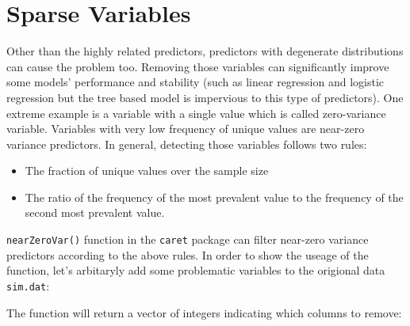\documentclass[12pt,]{krantz}
\makeatletter
\newenvironment{Shaded}{\begin{snugshade}}{\end{snugshade}}
\newcommand{\CommentTok}[1]{\textcolor[rgb]{0.37,0.37,0.37}{\textit{#1}}}
\newcommand{\DecValTok}[1]{\textcolor[rgb]{0.06,0.06,0.06}{#1}}
\newcommand{\KeywordTok}[1]{\textcolor[rgb]{0.27,0.27,0.27}{\textbf{#1}}}
\newcommand{\NormalTok}[1]{#1}
\newcommand{\OperatorTok}[1]{\textcolor[rgb]{0.43,0.43,0.43}{\textbf{#1}}}
\newcommand{\StringTok}[1]{\textcolor[rgb]{0.5,0.5,0.5}{#1}}
\providecommand{\tightlist}{%
  \setlength{\itemsep}{0pt}\setlength{\parskip}{0pt}}
\newenvironment{kframe}{%
\medskip{}
\setlength{\fboxsep}{.8em}
 \def\at@end@of@kframe{}%
 \ifinner\ifhmode%
  \def\at@end@of@kframe{\end{minipage}}%
  \begin{minipage}{\columnwidth}%
 \fi\fi%
 \def\FrameCommand##1{\hskip\@totalleftmargin \hskip-\fboxsep
 \colorbox{shadecolor}{##1}\hskip-\fboxsep
     \hskip-\linewidth \hskip-\@totalleftmargin \hskip\columnwidth}%
 \MakeFramed {\advance\hsize-\width
   \@totalleftmargin\z@ \linewidth\hsize
   \@setminipage}}%
 {\par\unskip\endMakeFramed%
 \at@end@of@kframe}
\renewenvironment{Shaded}{\begin{kframe}}{\end{kframe}}
\makeatother
\begin{document}
\hypertarget{sparse-variables}{%
\section{Sparse Variables}\label{sparse-variables}}

Other than the highly related predictors, predictors with degenerate distributions can cause the problem too. Removing those variables can significantly improve some models' performance and stability (such as linear regression and logistic regression but the tree based model is impervious to this type of predictors). One extreme example is a variable with a single value which is called zero-variance variable. Variables with very low frequency of unique values are near-zero variance predictors. In general, detecting those variables follows two rules:

\begin{itemize}
\tightlist
\item
  The fraction of unique values over the sample size
\item
  The ratio of the frequency of the most prevalent value to the frequency of the second most prevalent value.
\end{itemize}

\texttt{nearZeroVar()} function in the \texttt{caret} package can filter near-zero variance predictors according to the above rules. In order to show the useage of the function, let's arbitaryly add some problematic variables to the origional data \texttt{sim.dat}:

\begin{Shaded}
\end{Shaded}

The function will return a vector of integers indicating which columns to remove:
\end{document}
